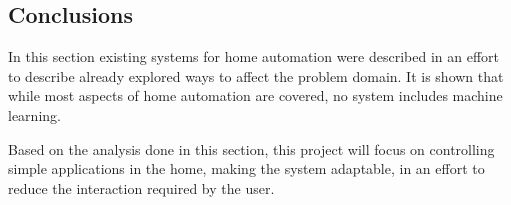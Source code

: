 \subsection{Conclusions}
In this section existing systems for home automation were described in an effort to describe already explored ways to affect the problem domain. It is shown that while most aspects of home automation are covered, no system includes machine learning.

Based on the analysis done in this section, this project will focus on controlling simple applications in the home, making the system adaptable, in an effort to reduce the interaction required by the user.
